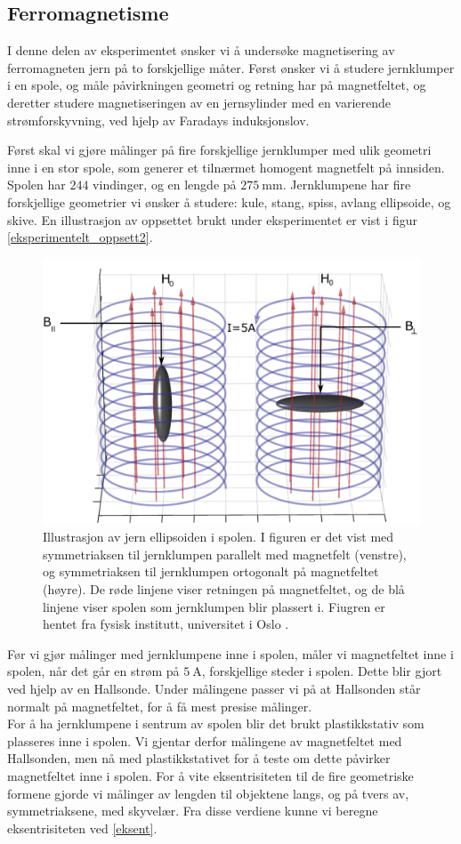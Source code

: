 \documentclass[%
 reprint,
nofootinbib,
aps,
]{revtex4-1}
\begin{document}
\subsection{Ferromagnetisme}
I denne delen av eksperimentet ønsker vi å undersøke magnetisering av ferromagneten jern på to forskjellige måter. Først ønsker vi å studere jernklumper i en spole, og måle påvirkningen geometri og retning har på magnetfeltet, og deretter studere magnetiseringen av en jernsylinder med en varierende strømforskyvning, ved hjelp av Faradays induksjonslov. \par
Først skal vi gjøre målinger på fire forskjellige jernklumper med ulik geometri inne i en stor spole, som generer et tilnærmet homogent magnetfelt på innsiden. Spolen har $244$ vindinger, og en lengde på $\SI{275}{\milli\meter}$. Jernklumpene har fire forskjellige geometrier vi ønsker å studere: kule, stang, spiss, avlang ellipsoide, og skive. En illustrasjon av oppsettet brukt under eksperimentet er vist i figur \vref{eksperimentelt_oppsett2}.
\begin{figure}[h!]
  \centering
  \includegraphics[scale=0.24]{oppsett2.png}
  \caption{Illustrasjon av jern ellipsoiden i spolen. I figuren er det vist med symmetriaksen til jernklumpen parallelt med magnetfelt (venstre), og symmetriaksen til jernklumpen ortogonalt på magnetfeltet (høyre). De røde linjene viser retningen på magnetfeltet, og de blå linjene viser spolen som jernklumpen blir plassert i. Fiugren er hentet fra fysisk institutt, universitet i Oslo \cite{oppgave}.}
  \label{eksperimentelt_oppsett2}
\end{figure}
Før vi gjør målinger med jernklumpene inne i spolen, måler vi magnetfeltet inne i spolen, når det går en strøm på $\SI{5}{\ampere}$, forskjellige steder i spolen. Dette blir gjort ved hjelp av en Hallsonde. Under målingene passer vi på at Hallsonden står normalt på magnetfeltet, for å få mest presise målinger.\\For å ha jernklumpene i sentrum av spolen blir det brukt plastikkstativ som plasseres inne i spolen. Vi gjentar derfor målingene av magnetfeltet med Hallsonden, men nå med plastikkstativet for å teste om dette påvirker magnetfeltet inne i spolen. For å vite eksentrisiteten til de fire geometriske formene gjorde vi målinger av lengden til objektene langs, og på tvers av, symmetriaksene, med skyvelær. Fra disse verdiene kunne vi beregne eksentrisiteten ved \eqref{eksent}.\\
\end{document}
